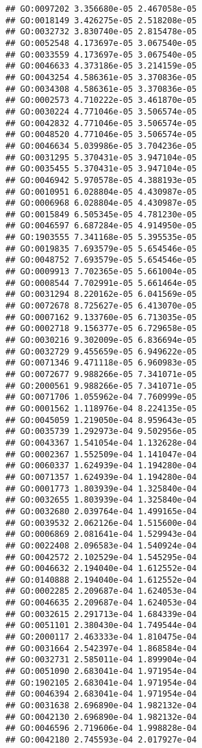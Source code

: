 \documentclass[
]{article}
\begin{document}
\begin{verbatim}
## GO:0097202 3.356680e-05 2.467058e-05
## GO:0018149 3.426275e-05 2.518208e-05
## GO:0032732 3.830740e-05 2.815478e-05
## GO:0052548 4.173697e-05 3.067540e-05
## GO:0033559 4.173697e-05 3.067540e-05
## GO:0046633 4.373186e-05 3.214159e-05
## GO:0043254 4.586361e-05 3.370836e-05
## GO:0034308 4.586361e-05 3.370836e-05
## GO:0002573 4.710222e-05 3.461870e-05
## GO:0030224 4.771046e-05 3.506574e-05
## GO:0042832 4.771046e-05 3.506574e-05
## GO:0048520 4.771046e-05 3.506574e-05
## GO:0046634 5.039986e-05 3.704236e-05
## GO:0031295 5.370431e-05 3.947104e-05
## GO:0035455 5.370431e-05 3.947104e-05
## GO:0046942 5.970578e-05 4.388193e-05
## GO:0010951 6.028804e-05 4.430987e-05
## GO:0006968 6.028804e-05 4.430987e-05
## GO:0015849 6.505345e-05 4.781230e-05
## GO:0046597 6.687284e-05 4.914950e-05
## GO:1903555 7.341168e-05 5.395535e-05
## GO:0019835 7.693579e-05 5.654546e-05
## GO:0048752 7.693579e-05 5.654546e-05
## GO:0009913 7.702365e-05 5.661004e-05
## GO:0008544 7.702991e-05 5.661464e-05
## GO:0031294 8.220162e-05 6.041569e-05
## GO:0072678 8.725627e-05 6.413070e-05
## GO:0007162 9.133760e-05 6.713035e-05
## GO:0002718 9.156377e-05 6.729658e-05
## GO:0030216 9.302009e-05 6.836694e-05
## GO:0032729 9.455659e-05 6.949622e-05
## GO:0071346 9.471118e-05 6.960983e-05
## GO:0072677 9.988266e-05 7.341071e-05
## GO:2000561 9.988266e-05 7.341071e-05
## GO:0071706 1.055962e-04 7.760999e-05
## GO:0001562 1.118976e-04 8.224135e-05
## GO:0045059 1.219050e-04 8.959643e-05
## GO:0035739 1.292973e-04 9.502956e-05
## GO:0043367 1.541054e-04 1.132628e-04
## GO:0002367 1.552509e-04 1.141047e-04
## GO:0060337 1.624939e-04 1.194280e-04
## GO:0071357 1.624939e-04 1.194280e-04
## GO:0001773 1.803939e-04 1.325840e-04
## GO:0032655 1.803939e-04 1.325840e-04
## GO:0032680 2.039764e-04 1.499165e-04
## GO:0039532 2.062126e-04 1.515600e-04
## GO:0006869 2.081641e-04 1.529943e-04
## GO:0022408 2.096583e-04 1.540924e-04
## GO:0042572 2.102529e-04 1.545295e-04
## GO:0046632 2.194040e-04 1.612552e-04
## GO:0140888 2.194040e-04 1.612552e-04
## GO:0002285 2.209687e-04 1.624053e-04
## GO:0046635 2.209687e-04 1.624053e-04
## GO:0032615 2.291713e-04 1.684339e-04
## GO:0051101 2.380430e-04 1.749544e-04
## GO:2000117 2.463333e-04 1.810475e-04
## GO:0031664 2.542397e-04 1.868584e-04
## GO:0032731 2.585011e-04 1.899904e-04
## GO:0051090 2.683041e-04 1.971954e-04
## GO:1902105 2.683041e-04 1.971954e-04
## GO:0046394 2.683041e-04 1.971954e-04
## GO:0031638 2.696890e-04 1.982132e-04
## GO:0042130 2.696890e-04 1.982132e-04
## GO:0046596 2.719606e-04 1.998828e-04
## GO:0042180 2.745593e-04 2.017927e-04

\end{verbatim}
\end{document}
